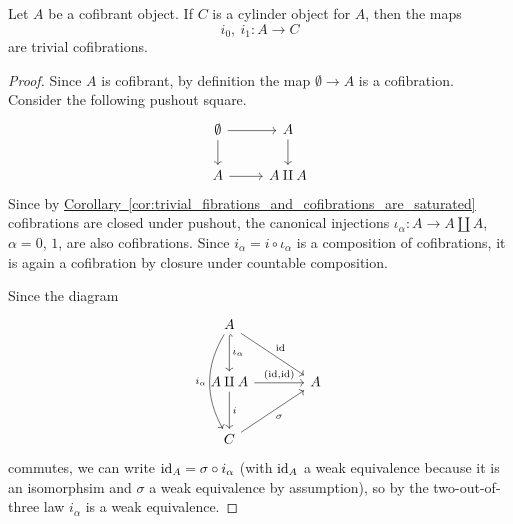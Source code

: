 \documentclass[main.tex]{subfiles}
\begin{document}
\begin{lemma}
  \label{lemma:cylinder_injections_are_trivial_cofibrations}
  Let $A$ be a cofibrant object. If $C$ is a cylinder object for $A$, then the maps 
  \begin{equation*}
    i_{0},\ i_{1}\colon A \to C
  \end{equation*}
  are trivial cofibrations.
\end{lemma}
\begin{proof}
  Since $A$ is cofibrant, by definition the map $\emptyset \to A$ is a cofibration. Consider the following pushout square.
  \begin{equation*}
    \begin{tikzcd}
      \emptyset
      \arrow[r]
      \arrow[d]
      & A
      \arrow[d]
      \\
      A
      \arrow[r]
      & A \amalg A
    \end{tikzcd}
  \end{equation*}
  Since by \hyperref[cor:trivial_fibrations_and_cofibrations_are_saturated]{Corollary~\ref*{cor:trivial_fibrations_and_cofibrations_are_saturated}} cofibrations are closed under pushout, the canonical injections $\iota_{\alpha}\colon A \to A \amalg A$, $\alpha = 0$, $1$, are also cofibrations. Since $i_{\alpha} = i \circ \iota_{\alpha}$ is a composition of cofibrations, it is again a cofibration by closure under countable composition.

  Since the diagram
  \begin{equation*}
    \begin{tikzcd}[row sep=large, column sep=large]
      A
      \arrow[d, hookrightarrow, "\iota_{\alpha}"]
      \arrow[rd, "\id"]
      \arrow[dd, bend right, swap, "i_{\alpha}"]
      \\
      A \amalg A
      \arrow[r, "{(\id, \id)}"]
      \arrow[d, "i"]
      & A
      \\
      C
      \arrow[ur, swap, "\sigma"]
    \end{tikzcd}
  \end{equation*}
  commutes, we can write $\mathrm{id}_{A} = \sigma \circ i_{\alpha}$ (with $\mathrm{id}_{A}$ a weak equivalence because it is an isomorphsim and $\sigma$ a weak equivalence by assumption), so by the two-out-of-three law $i_{\alpha}$ is a weak equivalence.
\end{proof}
\end{document}
